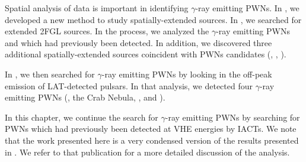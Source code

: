 Spatial analysis of \fermi data is important in identifying $\gamma$-ray
emitting \acp{PWN}.  In , we developed a new
method to study spatially-extended sources.  In ,
we searched for extended \ac{2FGL} sources.  In the process, we analyzed
the $\gamma$-ray emitting \acp{PWN}  and \mshfifteenfiftytwo
which had previously been detected.  In addition, we discovered three
additional spatially-extended \fermi sources coincident with \acp{PWN}
candidates (, , ).

In , we then searched for $\gamma$-ray emitting \acp{PWN}
by looking in the off-peak emission of \ac{LAT}-detected pulsars. In
that analysis, we detected four $\gamma$-ray emitting \acp{PWN} (\velax,
the Crab Nebula, \mshfifteenfiftytwo, and \threecfiftyeight).

In this chapter, we continue the search for $\gamma$-ray emitting
\acp{PWN} by searching for \acp{PWN} which had previously been
detected at \ac{VHE} energies by \acp{IACT}. We note that the work
presented here is a very condensed version of the results presented in
\citep{acero_2013a_constraints-galactic}.  We refer to that publication
for a more detailed discussion of the analysis.
